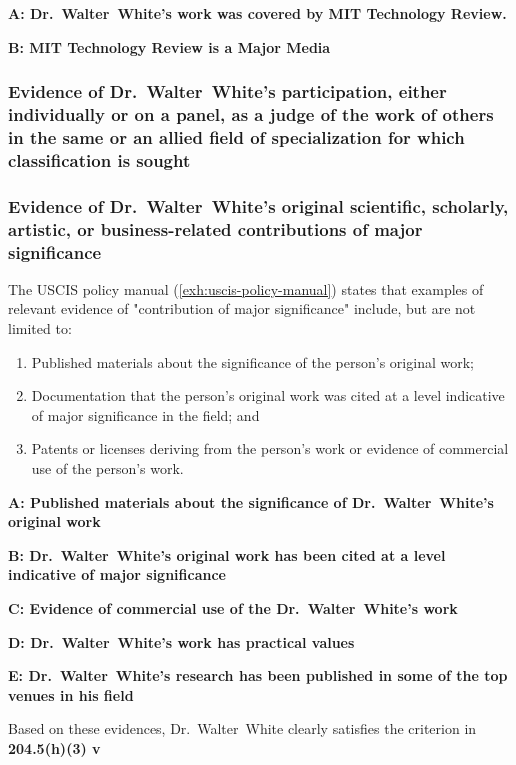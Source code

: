 \documentclass{article}
\newcommand{\fname}{Walter}
\newcommand{\lname}{White}
\newcommand{\dr}{Dr.~\fname~\lname}
\begin{document}
\noindent\textbf{A: \dr's work was covered by MIT Technology Review.}
\lipsum[1-1]

\noindent\textbf{B: MIT Technology Review is a Major Media}
\lipsum[1-1]


\subsubsection{
    Evidence of \dr's participation, either individually or on a panel,
    as a judge of the work of others in the same or
    an allied field of specialization for which classification is sought
}\label{sec:judge}
\lipsum[1-1]


\subsubsection{
    Evidence of \dr's original scientific, scholarly, artistic,
    or business-related contributions of major significance
}\label{sec:original-contribution}

The USCIS policy manual (\ref{exh:uscis-policy-manual})
states that  examples of relevant evidence of "contribution of major significance"
include, but are not limited to:
\begin{enumerate}
    \item Published materials about the significance of the person’s original work;
    \item Documentation that the person’s original work was cited at a level indicative of major significance in the field; and
    \item Patents or licenses deriving from the person’s work or evidence of commercial use of the person’s work.
\end{enumerate}

\noindent\textbf{A: Published materials about the significance of \dr's original work}
\lipsum[1-1]

\noindent\textbf{B: \dr's original work has been cited at a level indicative of major significance}
\lipsum[1-1]

\noindent\textbf{C: Evidence of commercial use of the \dr's work}
\lipsum[1-1]

\noindent\textbf{D: \dr's work has practical values}
\lipsum[1-1]

\noindent\textbf{E: \dr's research has been published in some of the top venues in his field}
\lipsum[1-1]


Based on these evidences, \dr{} clearly satisfies
the criterion in \textbf{204.5(h)(3) v}
\end{document}

